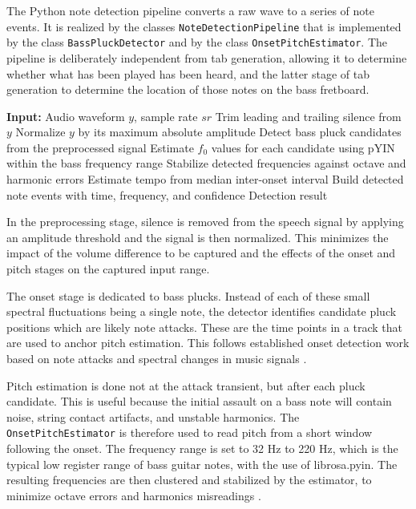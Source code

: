 \documentclass[a4paper, 12pt, titlepage]{article}
\begin{document}
The Python note detection pipeline converts a raw wave to a series of note events. It is realized by the classes \texttt{NoteDetectionPipeline} that is implemented by the class \texttt{BassPluckDetector} and by the class \texttt{OnsetPitchEstimator}. The pipeline is deliberately independent from tab generation, allowing it to determine whether what has been played has been heard, and the latter stage of tab generation to determine the location of those notes on the bass fretboard.

\begin{algorithm}[H]
    \caption{Bass Note Detection Pipeline}
    \label{alg:tabee_note_detection}
    \begin{algorithmic}[1]
        \State \textbf{Input:} Audio waveform $y$, sample rate $sr$
        \State Trim leading and trailing silence from $y$
        \State Normalize $y$ by its maximum absolute amplitude
        \State Detect bass pluck candidates from the preprocessed signal
        \State Estimate $f_0$ values for each candidate using pYIN within the bass frequency range
        \State Stabilize detected frequencies against octave and harmonic errors
        \State Estimate tempo from median inter-onset interval
        \State Build detected note events with time, frequency, and confidence
        \State \Return Detection result
    \end{algorithmic}
\end{algorithm}

In the preprocessing stage, silence is removed from the speech signal by applying an amplitude threshold and the signal is then normalized. This minimizes the impact of the volume difference to be captured and the effects of the onset and pitch stages on the captured input range.

The onset stage is dedicated to bass plucks. Instead of each of these small spectral fluctuations being a single note, the detector identifies candidate pluck positions which are likely note attacks. These are the time points in a track that are used to anchor pitch estimation. This follows established onset detection work based on note attacks and spectral changes in music signals \cite{bello2005,bock2012}.

Pitch estimation is done not at the attack transient, but after each pluck candidate. This is useful because the initial assault on a bass note will contain noise, string contact artifacts, and unstable harmonics. The \texttt{OnsetPitchEstimator} is therefore used to read pitch from a short window following the onset. The frequency range is set to 32 Hz to 220 Hz, which is the typical low register range of bass guitar notes, with the use of librosa.pyin. The resulting frequencies are then clustered and stabilized by the estimator, to minimize octave errors and harmonics misreadings \cite{decheveigne2002,camacho2008,mauch2014}.
\end{document}
